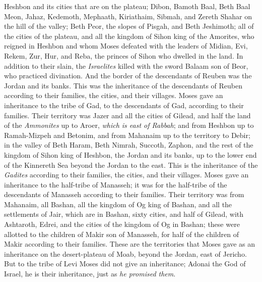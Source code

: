 \begin{biblechapter}
\verse Heshbon and its cities that are on the plateau; Dibon, Bamoth Baal, Beth Baal Meon,
\verse Jahaz, Kedemoth, Mephaath,
\verse Kiriathaim, Sibmah, and Zereth Shahar on the hill of the valley;
\verse Beth Peor, the slopes of Pisgah, and Beth Jeshimoth;
\verse all of the cities of the plateau, and all the kingdom of Sihon king of the Amorites, who reigned in Heshbon and whom Moses defeated with the leaders of Midian, Evi, Rekem, Zur, Hur, and Reba, the princes of Sihon who dwelled in the land.
\verse In addition to their slain, the \textit{Israelites} killed with the sword Balaam son of Beor, who practiced divination.
\verse And the border of the descendants of Reuben was the Jordan and its banks. This was the inheritance of the descendants of Reuben according to their families, the cities, and their villages.
 Moses gave an inheritance to the tribe of Gad, to the descendants of Gad, according to their families.
\verse Their territory was Jazer and all the cities of Gilead, and half the land of the \textit{Ammonites} up to Aroer, \textit{which is east of Rabbah};
\verse and from Heshbon up to Ramah-Mizpeh and Betonim, and from Mahanaim up to the territory to Debir;
\verse in the valley of Beth Haram, Beth Nimrah, Succoth, Zaphon, and the rest of the kingdom of Sihon king of Heshbon, the Jordan and its banks, up to the lower end of the Kinnereth Sea beyond the Jordan to the east.
\verse This is the inheritance of the \textit{Gadites} according to their families, the cities, and their villages.
 Moses gave an inheritance to the half-tribe of Manasseh; it was for the half-tribe of the descendants of Manasseh according to their families.
\verse Their territory was from Mahanaim, all Bashan, all the kingdom of Og king of Bashan, and all the settlements of Jair, which are in Bashan, sixty cities,
\verse and half of Gilead, with Ashtaroth, Edrei, and the cities of the kingdom of Og in Bashan; these were allotted to the children of Makir son of Manasseh, for half of the children of Makir according to their families.
\verse These are the territories that Moses gave as an inheritance on the desert-plateau of Moab, beyond the Jordan, east of Jericho.
\verse But to the tribe of Levi Moses did not give an inheritance; Adonai the God of Israel, he is their inheritance, just as \textit{he promised them}.
\end{biblechapter}

